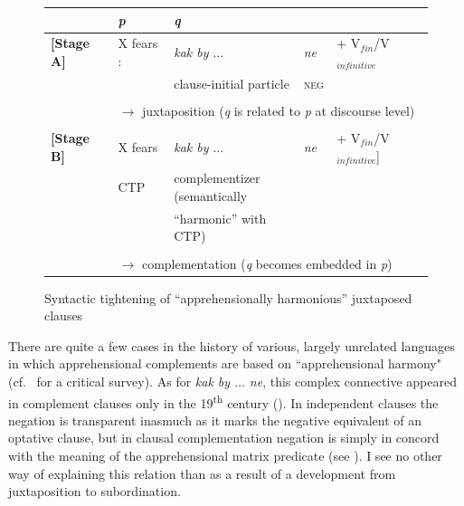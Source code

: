 \documentclass[output=paper,colorlinks,citecolor=brown]{langscibook}
\begin{document}
\begin{figure}[t]

\caption{Syntactic tightening of ``apprehensionally harmonious'' juxtaposed clauses}
\label{tab:syntactictightening}
\begin{tabular}{lllll}
\textit{}  & \textit{\textbf{p}} & \textit{\textbf{q}} &  & \\

\midrule

\textbf{{[}Stage A{]}} & X fears : & \textit{kak by  $\ldots$} & \textit{ne} & + V$_{fin}$/V$_{infinitive}$ \\
  &  &   {clause-initial particle} & \textsc{neg} & \\
\\
& \multicolumn{4}{l}{$\rightarrow$ juxtaposition (\textit{q} is related to \textit{p} at discourse level)} \\
\\

\textbf{{[}Stage B{]}} & X fears & \textit{kak by  $\ldots$} & \textit{ne} & + V$_{fin}$/V$_{infinitive}${]} \\
                 & CTP     & \multicolumn{2}{l}{complementizer (semantically} & \\
                 &    &  {``harmonic'' with CTP)} & \\
              \\
& \multicolumn{4}{l}{$\rightarrow$ complementation (\textit{q} becomes embedded in \textit{p})}
\end{tabular}
\end{figure}




 There are quite a few cases in the history of various, largely unrelated languages in which apprehensional complements are based on ``apprehensional harmony" (cf.\ \citealt{dobrushina2021} for a critical survey). As for  \textit{kak by $\ldots$ ne}, this complex connective appeared in complement clauses only in the 19\textsuperscript{th} century (\citealt[140--142]{dobrushina2021}). In independent clauses the negation is transparent inasmuch as it marks the negative equivalent of an optative clause, but in clausal complementation negation is simply in concord with the meaning of the apprehensional matrix predicate (see ). I see no other way of explaining this relation than as a result of a development from juxtaposition to subordination.
\end{document}

